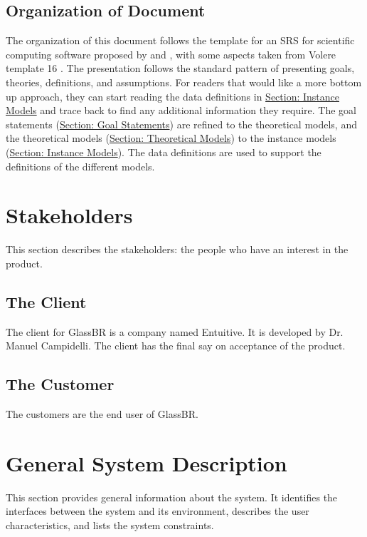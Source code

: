 \documentclass[12pt]{article}
\begin{document}
\subsection{Organization of Document}
\label{Sec:DocOrg}
The organization of this document follows the template for an SRS for scientific computing software proposed by \cite{koothoor2013} and \cite{smithLai2005}, with some aspects taken from Volere template 16 \cite{rbrtsn2012}. The presentation follows the standard pattern of presenting goals, theories, definitions, and assumptions. For readers that would like a more bottom up approach, they can start reading the data definitions in \hyperref[Sec:IMs]{Section: Instance Models} and trace back to find any additional information they require.
The goal statements (\hyperref[Sec:GoalStmt]{Section: Goal Statements}) are refined to the theoretical models, and the theoretical models (\hyperref[Sec:TMs]{Section: Theoretical Models}) to the instance models (\hyperref[Sec:IMs]{Section: Instance Models}). The data definitions are used to support the definitions of the different models.
\section{Stakeholders}
\label{Sec:Stakeholder}
This section describes the stakeholders: the people who have an interest in the product.
\subsection{The Client}
\label{Sec:Client}
The client for GlassBR is a company named Entuitive. It is developed by Dr. Manuel Campidelli. The client has the final say on acceptance of the product.
\subsection{The Customer}
\label{Sec:Customer}
The customers are the end user of GlassBR.
\section{General System Description}
\label{Sec:GenSysDesc}
This section provides general information about the system. It identifies the interfaces between the system and its environment, describes the user characteristics, and lists the system constraints.
\end{document}
